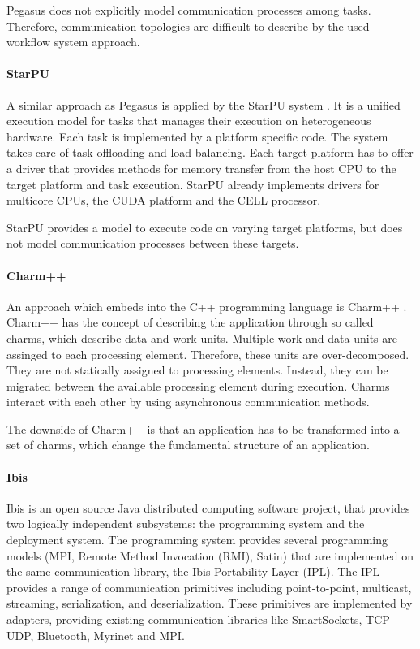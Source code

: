 Pegasus does not explicitly model communication processes among tasks.
Therefore, communication topologies are difficult to describe by the
used workflow system approach.


\paragraph*{StarPU} 
A similar approach as Pegasus is applied by the StarPU system
\cite{ref:starpu}.  It is a unified execution model for tasks that
manages their execution on heterogeneous hardware.  Each task is
implemented by a platform specific code. The system takes care of
task offloading and load balancing. Each target platform has to offer
a driver that provides methods for memory transfer from the host CPU
to the target platform and task execution. StarPU already implements
drivers for multicore CPUs, the CUDA platform and the CELL processor.

StarPU provides a model to execute code on varying target platforms,
but does not model communication processes between these targets.

\paragraph*{Charm++} 
An approach which embeds into the C++ programming language is Charm++
\cite{ref:charm}. Charm++ has the concept of describing the
application through so called charms, which describe data and work
units. Multiple work and data units are assinged to each processing
element. Therefore, these units are over-decomposed.  They are not
statically assigned to processing elements. Instead, they can be
migrated between the available processing element during
execution. Charms interact with each other by using asynchronous
communication methods.

The downside of Charm++ is that an application has to be transformed
into a set of charms, which change the fundamental structure of an
application.

\paragraph*{Ibis} 
Ibis \cite{ref:ibis} is an open source Java distributed computing
software project, that provides two logically independent subsystems:
the programming system and the deployment system. The programming
system provides several programming models (MPI, Remote Method Invocation (RMI), Satin) that are
implemented on the same communication library, the Ibis Portability
Layer (IPL).  The IPL provides a range of communication primitives
including point-to-point, multicast, streaming, serialization, and
deserialization. These primitives are implemented by adapters,
providing existing communication libraries like SmartSockets, TCP UDP,
Bluetooth, Myrinet and MPI.


